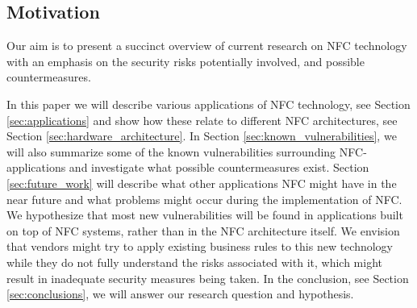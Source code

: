 
\subsection{Motivation}
Our aim is to present a succinct overview of current research on NFC technology with an emphasis on the security risks potentially involved, and possible countermeasures.



In this paper we will describe various applications of NFC technology, see Section \ref{sec:applications} and show how these relate to different NFC architectures, see Section \ref{sec:hardware_architecture}.
In Section \ref{sec:known_vulnerabilities}, we will also summarize some of the known vulnerabilities surrounding NFC-applications and investigate what possible countermeasures exist.
Section \ref{sec:future_work} will describe what other applications NFC might have in the near future and what problems might occur during the implementation of NFC.
We hypothesize that most new vulnerabilities will be found in applications built on top of NFC systems, rather than in the NFC architecture itself.
We envision that vendors might try to apply existing business rules to this new technology while they do not fully understand the risks associated with it, which might result in inadequate security measures being taken.
In the conclusion, see Section \ref{sec:conclusions}, we will answer our research question and hypothesis.


